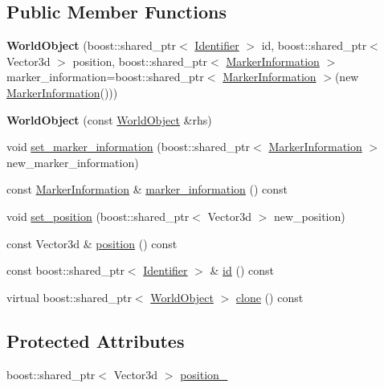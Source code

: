 \subsection*{Public Member Functions}
\begin{CompactItemize}
\item 
\hypertarget{class_world_object_7bd53cd60f7d36d5ce95d47eaed9f835}{
\textbf{WorldObject} (boost::shared\_\-ptr$<$ \hyperlink{class_identifier}{Identifier} $>$ id, boost::shared\_\-ptr$<$ Vector3d $>$ position, boost::shared\_\-ptr$<$ \hyperlink{class_marker_information}{MarkerInformation} $>$ marker\_\-information=boost::shared\_\-ptr$<$ \hyperlink{class_marker_information}{MarkerInformation} $>$(new \hyperlink{class_marker_information}{MarkerInformation}()))}
\label{class_world_object_7bd53cd60f7d36d5ce95d47eaed9f835}

\item 
\hypertarget{class_world_object_057d73f35e0574e1f8e8f1437cdaaa25}{
\textbf{WorldObject} (const \hyperlink{class_world_object}{WorldObject} \&rhs)}
\label{class_world_object_057d73f35e0574e1f8e8f1437cdaaa25}

\item 
void \hyperlink{class_world_object_a502586bf3c68894552f805cd6b99670}{set\_\-marker\_\-information} (boost::shared\_\-ptr$<$ \hyperlink{class_marker_information}{MarkerInformation} $>$ new\_\-marker\_\-information)
\item 
const \hyperlink{class_marker_information}{MarkerInformation} \& \hyperlink{class_world_object_1dd7d80498c6b502ad9870c54cbf4305}{marker\_\-information} () const 
\item 
void \hyperlink{class_world_object_60afe09f64b069c79833bb9a07a71cc1}{set\_\-position} (boost::shared\_\-ptr$<$ Vector3d $>$ new\_\-position)
\item 
const Vector3d \& \hyperlink{class_world_object_27b52dcd1b64d4dd45936da833e1ea26}{position} () const 
\item 
const boost::shared\_\-ptr$<$ \hyperlink{class_identifier}{Identifier} $>$ \& \hyperlink{class_world_object_86cb6d16f21d52ebe8f9dc48e9e762f3}{id} () const 
\item 
virtual boost::shared\_\-ptr$<$ \hyperlink{class_world_object}{WorldObject} $>$ \hyperlink{class_world_object_dba468299ce77ce5781e60081bf44b14}{clone} () const 
\end{CompactItemize}
\subsection*{Protected Attributes}
\begin{CompactItemize}
\item 
boost::shared\_\-ptr$<$ Vector3d $>$ \hyperlink{class_world_object_f445cb9e3a29647e35064a14ae458b78}{position\_\-}
\end{CompactItemize}
